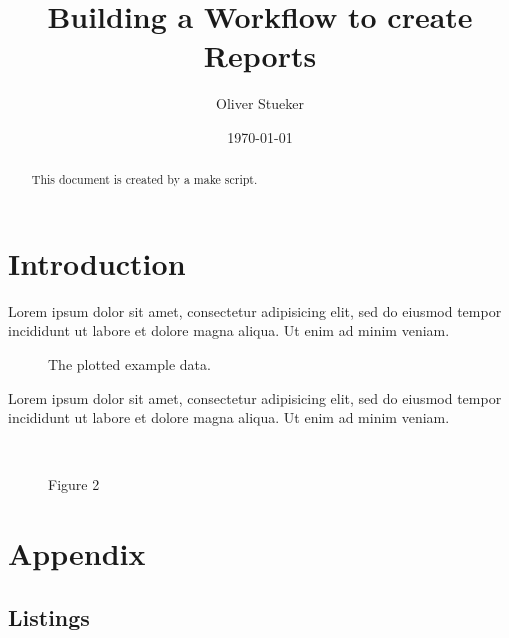 \documentclass[10pt,letterpaper]{article}
\begin{document}
\title{Building a Workflow to create Reports}
\author{Oliver Stueker}
\date{\today}
\maketitle

\begin{abstract}
This document is created by a make script.
\end{abstract}

\section{Introduction}
Lorem ipsum dolor sit amet, consectetur adipisicing elit, sed do eiusmod
tempor incididunt ut labore et dolore magna aliqua. Ut enim ad minim veniam.

\begin{figure}[!ht]
	\centering
	
	\caption{The plotted example data.}
\end{figure}

Lorem ipsum dolor sit amet, consectetur adipisicing elit, sed do eiusmod
tempor incididunt ut labore et dolore magna aliqua. Ut enim ad minim veniam.

\begin{figure}
	\centering
	\subfloat[Figure 2a]{
		
		\label{fig:figure2a}
	}
	~
	\subfloat[Figure 2b]{
		
		\label{fig:figure2b}
	}
	~
	\subfloat[Figure 2c]{
		
		\label{fig:figure2c}
	}
	\caption{Figure 2}
	\label{fig:figure2}
\end{figure}

\newpage
\section{Appendix}
\subsection{Listings}

\end{document}

